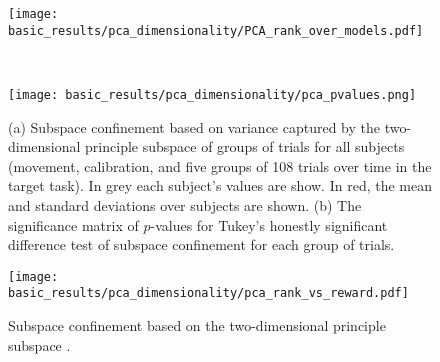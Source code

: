 \documentclass[../main.tex]{subfiles}
\begin{document}
\begin{figure}[!htb]
  \centering
  \begin{minipage}{\textwidth}
    \centering
    \texttt{[image: basic\_results/pca\_dimensionality/PCA\_rank\_over\_models.pdf]}
    \subcaption{}
  \end{minipage}\\%
  \begin{minipage}{\textwidth}
    \centering
    \texttt{[image: basic\_results/pca\_dimensionality/pca\_pvalues.png]}
    \subcaption{}
  \end{minipage}
  \caption[Subspace confinement over tasks]{(a) Subspace confinement based on variance captured by the two-dimensional principle subspace of groups of trials for all subjects (movement, calibration, and five groups of 108 trials over time in the target task). In grey each subject's values are show. In red, the mean and standard deviations over subjects are shown. (b) The significance matrix of $p$-values for Tukey's honestly significant difference test of subspace confinement for each group of trials.}\label{fig:pca_rank}
\end{figure}

\begin{figure}[!htb]
  \centering
  \texttt{[image: basic\_results/pca\_dimensionality/pca\_rank\_vs\_reward.pdf]}
  \caption[Subspace confinement versus reward]{Subspace confinement based on the two-dimensional principle subspace .}\label{fig:pca_rank_vs_reward}
\end{figure}
\end{document}

